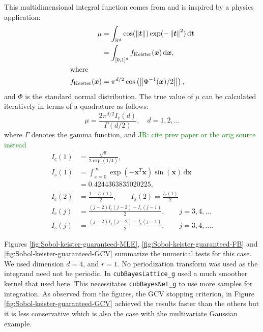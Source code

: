 \documentclass[graybox,footinfo]{svmult}
\newcommand{\bm}[1]{\boldsymbol{#1}}
\newcommand{\dif}[1]{\text{d}{#1}}
\newcommand{\reals}{\mathbb{R}}
\newcommand{\vt}{\bm{t}}
\newcommand{\vx}{\bm{x}}
\newcommand{\dvx}{\dif{\bm{x}}}
\newcommand{\dvt}{\dif{\bm{t}}}
\newcommand{\code}[1]{\texttt{#1}}
\newcommand{\norm}[2][{}]{\ensuremath{\left \lVert #2 \right \rVert}_{#1}}
\newcommand{\JRNote}[1]{{\textcolor{green}{JR: #1}}}
\begin{document}
This multidimensional integral function comes from \cite{Kei96} and is inspired by a physics application:
\begin{align}
\label{eqn:keister_integral}
\mu & =  \int_{\reals^d} \cos(\norm{ \vt}) \exp(-\norm{ \vt }^2) \, \dvt \\
\nonumber
& = \int_{[0,1]^d} f_{\textup{Keister}}(\vx) \, \dvx,\\
\intertext{where }
\nonumber
f_\textup{Keister}(\vx) &= \pi^{d/2} \cos\left(\norm{ \Phi^{-1}(\vx)/2}\right)  ,
\end{align}
and $\Phi$ is the standard normal distribution.
The true value of $\mu$ can be calculated iteratively in terms of a quadrature as follows:  
\begin{equation*}
\mu = \frac{2 \pi^{d/2} I_c(d)}{\Gamma(d/2)}, \quad d=1,2, \ldots
\end{equation*}
where $\Gamma$ denotes the gamma function, and
\JRNote{cite prev paper or the orig source instead}
\begin{align*}
I_c(1) &= \frac{\sqrt{\pi}}{2 \exp(1/4)}, 
\\
I_s(1) &= \int_{x=0}^\infty \exp(-\vx^T\vx)\sin(\vx) \, \dvx 
\\
& =  0.4244363835020225,
\\
I_c(2) &= \frac{1-I_s(1)}{2}, \qquad
I_s(2) = \frac{I_c(1)}{2}
\\
I_c(j) &= \frac{(j-2)I_c(j-2)-I_s(j-1)}{2},
\qquad j =3,4,\ldots
\\
I_s(j) &= \frac{(j-2)I_s(j-2)-I_c(j-1)}{2},
\qquad j =3,4,\ldots.
\end{align*}


Figures \ref{fig:Sobol-keister-guaranteed-MLE}, \ref{fig:Sobol-keister-guaranteed-FB} and \ref{fig:Sobol-keister-guaranteed-GCV} summarize the numerical tests for this case. We used  dimension $d=4$, and $r=1$.  No periodization transform was used as the integrand need not be periodic. 
In \cite{RatHic19a} \code{cubBayesLattice\_g} used a much smoother kernel that used here.
This necessitates \code{cubBayesNet\_g} to use more samples for integration.
As observed from the figures, the GCV stopping criterion, in Figure \ref{fig:Sobol-keister-guaranteed-GCV} achieved the results faster than the others but it is less conservative which is also the case with the multivariate Gaussian example.
\end{document}
